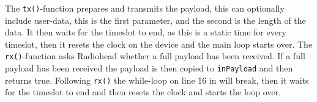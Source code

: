The \texttt{tx()}-function prepares and transmits the payload, this can optionally include user-data, this is the first parameter, and the second is the length of the data.
It then waits for the timeslot to end, as this is a static time for every timeslot, then it resets the clock on the device and the main loop starts over.
The \texttt{rx()}-function asks Radiohead whether a full payload has been received. 
If a full payload has been received the payload is then copied to \texttt{inPayload} and then returns true.
Following \texttt{rx()} the while-loop on line 16 in  will break, then it waits for the timeslot to end and then resets the clock and starts the loop over. 
